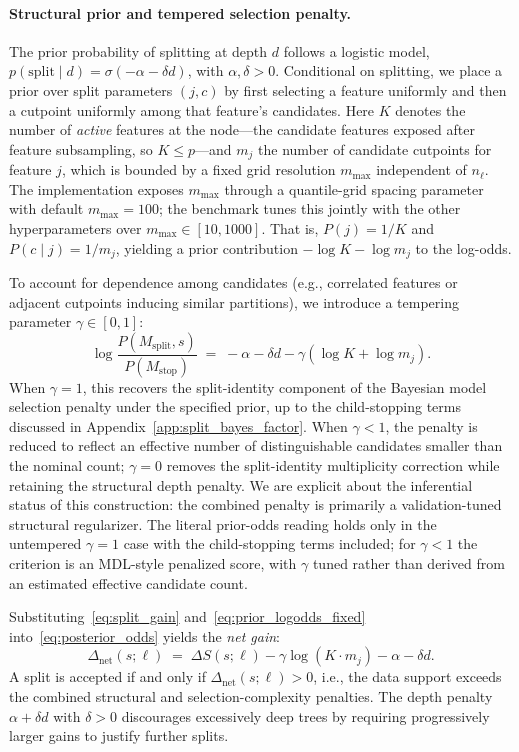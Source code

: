 \documentclass[10pt]{article} %
\begin{document}
\paragraph{Structural prior and tempered selection penalty.}
The prior probability of splitting at depth $d$ follows a logistic model, $p(\mathrm{split} \mid d) = \sigma(-\alpha - \delta d)$, with $\alpha, \delta > 0$.
Conditional on splitting, we place a prior over split parameters $(j,c)$ by first selecting a feature uniformly and then a cutpoint uniformly among that feature's candidates. Here $K$ denotes the number of \emph{active} features at the node---the candidate features exposed after feature subsampling, so $K \le p$---and $m_j$ the number of candidate cutpoints for feature $j$, which is bounded by a fixed grid resolution $m_{\max}$ independent of $n_\ell$. The implementation exposes $m_{\max}$ through a quantile-grid spacing parameter with default $m_{\max}=100$; the benchmark tunes this jointly with the other hyperparameters over $m_{\max}\in[10,1000]$. That is, $P(j) = 1/K$ and $P(c \mid j) = 1/m_j$, yielding a prior contribution $-\log K - \log m_j$ to the log-odds.

To account for dependence among candidates (e.g., correlated features or adjacent cutpoints inducing similar partitions), we introduce a tempering parameter $\gamma \in [0,1]$:
\begin{equation}\label{eq:prior_logodds_fixed}
\log \frac{P(M_{\mathrm{split}}, s)}{P(M_{\mathrm{stop}})}
\;=\;
-\alpha - \delta d - \gamma(\log K + \log m_j).
\end{equation}
When $\gamma = 1$, this recovers the split-identity component of the Bayesian model selection penalty under the specified prior, up to the child-stopping terms discussed in Appendix~\ref{app:split_bayes_factor}. When $\gamma < 1$, the penalty is reduced to reflect an effective number of distinguishable candidates smaller than the nominal count; $\gamma=0$ removes the split-identity multiplicity correction while retaining the structural depth penalty. We are explicit about the inferential status of this construction: the combined penalty is primarily a validation-tuned structural regularizer. The literal prior-odds reading holds only in the untempered $\gamma=1$ case with the child-stopping terms included; for $\gamma<1$ the criterion is an MDL-style penalized score, with $\gamma$ tuned rather than derived from an estimated effective candidate count.

Substituting~\eqref{eq:split_gain} and~\eqref{eq:prior_logodds_fixed} into~\eqref{eq:posterior_odds} yields the \emph{net gain}:
\begin{equation}\label{eq:net_gain}
\Delta_{\mathrm{net}}(s;\ell)
\;=\;
\Delta S(s;\ell) - \gamma\log(K \cdot m_j) - \alpha - \delta d.
\end{equation}
A split is accepted if and only if $\Delta_{\mathrm{net}}(s;\ell) > 0$, i.e., the data support exceeds the combined structural and selection-complexity penalties.
The depth penalty $\alpha + \delta d$ with $\delta > 0$ discourages excessively deep trees by requiring progressively larger gains to justify further splits.
\end{document}
